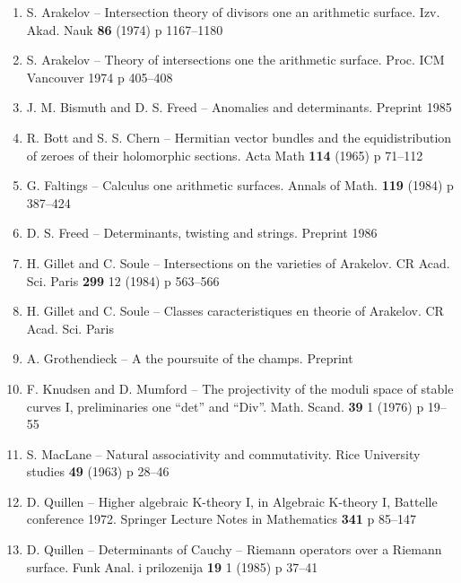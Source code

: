\documentclass[12pt,a4paper]{article}
\theoremstyle{plain}
\theoremstyle{definition}
\theoremstyle{remark}
\begin{document}
\begin{enumerate}
\item[{[1]}] S. Arakelov -- Intersection theory of divisors one an arithmetic surface. Izv. Akad. Nauk \textbf{86} (1974) p 1167--1180

\item[{[2]}] S. Arakelov -- Theory of intersections one the arithmetic surface. Proc. ICM Vancouver 1974 p 405--408

\item[{[3]}] J. M. Bismuth and D. S. Freed -- Anomalies and determinants. Preprint 1985

\item[{[4]}] R. Bott and S. S. Chern -- Hermitian vector bundles and the equidistribution of zeroes of their holomorphic sections. Acta Math \textbf{114} (1965) p 71--112

\item[{[5]}] G. Faltings -- Calculus one arithmetic surfaces. Annals of Math. \textbf{119} (1984) p 387--424

\item[{[6]}] D. S. Freed -- Determinants, twisting and strings. Preprint 1986

\item[{[7]}] H. Gillet and C. Soule -- Intersections on the varieties of Arakelov. CR Acad. Sci. Paris \textbf{299} 12 (1984) p 563--566

\item[{[8]}] H. Gillet and C. Soule -- Classes caracteristiques en theorie of Arakelov. CR Acad. Sci. Paris

\item[{[9]}] A. Grothendieck -- A the poursuite of the champs. Preprint

\item[{[10]}] F. Knudsen and D. Mumford -- The projectivity of the moduli space of stable curves I, preliminaries one ``det'' and ``Div''. Math. Scand. \textbf{39} 1 (1976) p 19--55

\item[{[11]}] S. MacLane -- Natural associativity and commutativity. Rice University studies \textbf{49} (1963) p 28--46

\item[{[12]}] D. Quillen -- Higher algebraic K-theory I, in Algebraic K-theory I, Battelle conference 1972. Springer Lecture Notes in Mathematics \textbf{341} p 85--147

\item[{[13]}] D. Quillen -- Determinants of Cauchy -- Riemann operators over a Riemann surface. Funk Anal. i prilozenija \textbf{19} 1 (1985) p 37--41


\end{enumerate}
\end{document}
